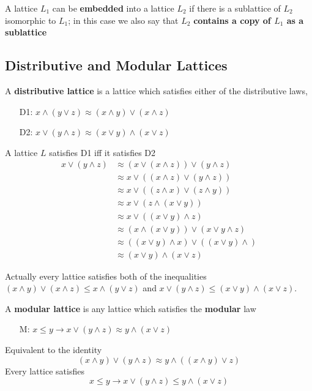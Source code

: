 \documentclass[11pt]{article}
\begin{document}
\begin{definition}[]
A lattice \(L_1\) can be \textbf{embedded} into a lattice \(L_2\) if there is a sublattice
of \(L_2\) isomorphic to \(L_1\); in this case we also say that \(L_2\) 
\textbf{contains a copy of \(L_1\) as a sublattice}
\end{definition}

\subsection{Distributive and Modular Lattices}
\label{sec:org6c36a0e}
\begin{definition}[]
A \textbf{distributive lattice} is a lattice which satisfies either  of the
distributive laws,
\begin{itemize}
\item[D1:] \(x\wedge(y\vee z)\approx(x\wedge y)\vee(x\wedge z)\)
\item[D2:] \(x\vee(y\wedge z)\approx(x\vee y)\wedge(x\vee z)\)
\end{itemize}
\end{definition}

\begin{theorem}[]
A lattice \(L\) satisfies D1 iff it satisfies D2
\begin{align*}
x\vee(y\wedge z)&\approx(x\vee(x\wedge z))\vee(y\wedge z)\tag*{(by L4(a))}\\
&\approx x\vee((x\wedge z)\vee(y\wedge z))\\
&\approx x\vee((z\wedge x)\vee(z\wedge y))\\
&\approx x\vee(z\wedge(x\vee y))\\
&\approx x\vee((x\vee y)\wedge z)\\
&\approx (x\wedge(x\vee y))\vee(x\vee y\wedge z)\\
&\approx ((x\vee y)\wedge x)\vee((x\vee y)\wedge)\\
&\approx (x\vee y)\wedge(x\vee z)
\end{align*}
\end{theorem}

Actually every lattice satisfies both of the inequalities
\((x\wedge y)\vee(x\wedge z)\le x\wedge(y\vee z)\) and
\(x\vee(y\wedge z)\le(x\vee y)\wedge(x\vee z)\).

\begin{definition}[]
A \textbf{modular lattice} is any lattice which satisfies the \textbf{modular} law
\begin{itemize}
\item[M:] \(x\le y\to x\vee(y\wedge z)\approx y\wedge(x\vee z)\)
\end{itemize}
\end{definition}
Equivalent to the identity
\begin{equation*}
(x\wedge y)\vee(y\wedge z)\approx y\wedge((x\wedge y)\vee z)
\end{equation*}
Every lattice satisfies
\begin{equation*}
x\le y\to x\vee(y\wedge z)\le y\wedge(x\vee z)
\end{equation*}
\end{document}
